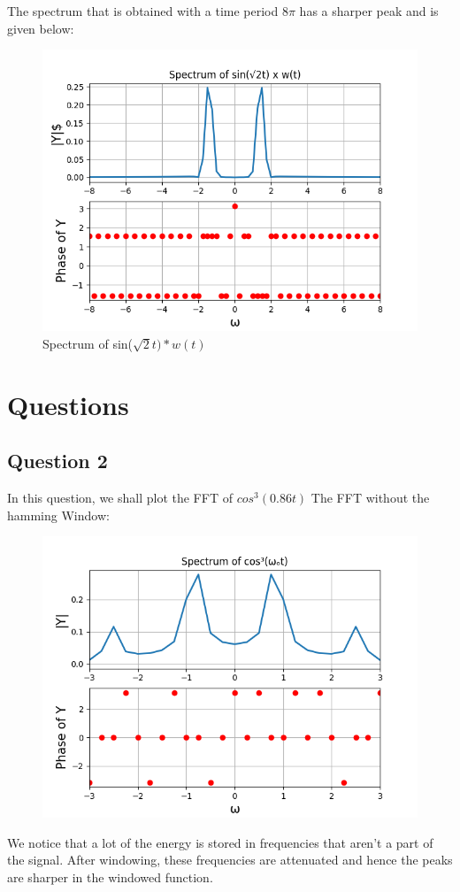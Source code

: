 \documentclass[11pt, a4paper]{article}
\begin{document}
The spectrum that is obtained with a time period $8\pi$ has a sharper peak and is given below:
\begin{figure}[h!]
\centering
\includegraphics[scale=0.6]{fig10-7.png}
\caption{Spectrum of sin($\sqrt{2}t)*w(t)$}
\label{fig:universe}
\end{figure}
 
\section{Questions}
\subsection{Question 2}
In this question, we shall plot the FFT of $cos^3(0.86t)$
The FFT without the hamming Window:
\begin{figure}[h!]
\centering
\includegraphics[scale=0.6]{10-8_NoWindow.png}
\label{fig:universe}
\end{figure}
\clearpage
We notice that a lot of the energy is stored in frequencies that aren't a part of the signal. After windowing, these frequencies are attenuated and hence the peaks are sharper in the windowed function. 
\end{document}
